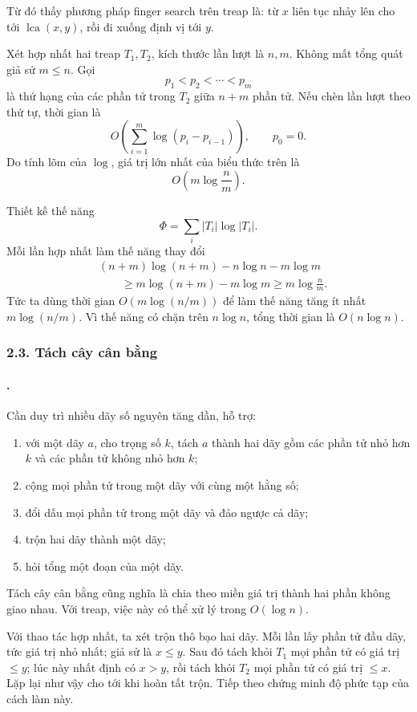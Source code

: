 \documentclass[11pt]{article}
\begin{document}
Từ đó thấy phương pháp finger search trên treap là: từ \(x\) liên tục nhảy lên
cho tới \(\operatorname{lca}(x,y)\), rồi đi xuống định vị tới \(y\).

Xét hợp nhất hai treap \(T_1,T_2\), kích thước lần lượt là \(n,m\). Không mất
tổng quát giả sử \(m\le n\). Gọi
\[
  p_1<p_2<\cdots<p_m
\]
là thứ hạng của các phần tử trong \(T_2\) giữa \(n+m\) phần tử. Nếu chèn lần
lượt theo thứ tự, thời gian là
\[
  O\!\left(\sum_{i=1}^{m}\log(p_i-p_{i-1})\right),\qquad p_0=0.
\]
Do tính lõm của \(\log\), giá trị lớn nhất của biểu thức trên là
\[
  O\!\left(m\log\frac{n}{m}\right).
\]

Thiết kế thế năng
\[
  \Phi=\sum_i |T_i|\log |T_i|.
\]
Mỗi lần hợp nhất làm thế năng thay đổi
\[
\begin{aligned}
  &(n+m)\log(n+m)-n\log n-m\log m\\
  &\qquad\ge m\log(n+m)-m\log m
  \ge m\log\frac{n}{m}.
\end{aligned}
\]
Tức ta dùng thời gian \(O(m\log(n/m))\) để làm thế năng tăng ít nhất
\(m\log(n/m)\). Vì thế năng có chặn trên \(n\log n\), tổng thời gian là
\(O(n\log n)\).

\subsubsection*{2.3. Tách cây cân bằng}

\paragraph{.}
Cần duy trì nhiều dãy số nguyên tăng dần, hỗ trợ:
\begin{enumerate}
  \item với một dãy \(a\), cho trọng số \(k\), tách \(a\) thành hai dãy gồm các
  phần tử nhỏ hơn \(k\) và các phần tử không nhỏ hơn \(k\);
  \item cộng mọi phần tử trong một dãy với cùng một hằng số;
  \item đổi dấu mọi phần tử trong một dãy và đảo ngược cả dãy;
  \item trộn hai dãy thành một dãy;
  \item hỏi tổng một đoạn của một dãy.
\end{enumerate}

Tách cây cân bằng cũng nghĩa là chia theo miền giá trị thành hai phần không
giao nhau. Với treap, việc này có thể xử lý trong \(O(\log n)\).

Với thao tác hợp nhất, ta xét trộn thô bạo hai dãy. Mỗi lần lấy phần tử đầu
dãy, tức giá trị nhỏ nhất; giả sử là \(x\le y\). Sau đó tách khỏi \(T_1\) mọi
phần tử có giá trị \(\le y\); lúc này nhất định có \(x>y\), rồi tách khỏi
\(T_2\) mọi phần tử có giá trị \(\le x\). Lặp lại như vậy cho tới khi hoàn tất
trộn. Tiếp theo chứng minh độ phức tạp của cách làm này.
\end{document}
